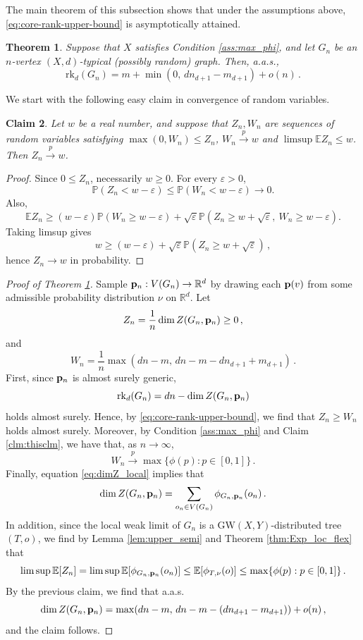 \documentclass[reqno,english]{amsart}
\numberwithin{equation}{section}
\newtheorem{theorem}{Theorem}[section]
\newtheorem{claim}[theorem]{Claim}
\theoremstyle{definition}{
\newtheorem{example}[theorem]{Example}
\newtheorem{definition}[theorem]{Definition}
\newtheorem*{definition*}{Definition}
\newtheorem{problem}[theorem]{Problem}
\newtheorem{question}[theorem]{Question}
}
\newcommand{\E}{\mathbb E}
\renewcommand{\P}{\mathbb P}
\newcommand{\R}{\mathbb R}
\newcommand{\p}{{\bf p}}
\begin{document}
The main theorem of this subsection shows that under the assumptions above, \eqref{eq:core-rank-upper-bound} is asymptotically attained.
\begin{theorem}\label{thm:rd_degreeX}
Suppose that $X$ satisfies Condition \ref{ass:max_phi}, and 
let $G_n$ be an $n$-vertex $(X,d)$-typical (possibly random) graph. Then, a.a.s.,
\[ 
\mathrm{rk}_d(G_n)=
    m+\min\left(0,\,dn_{d+1}-m_{d+1}\right) + o(n)\,.
\]
\end{theorem}
We start with the following easy claim in convergence of random variables.
\begin{claim}
    Let $w$ be a real number, and suppose that $Z_n,W_n$ are sequences of random variables satisfying $\max(0,W_n)\le Z_n$, $W_n\xrightarrow{p}w$ and $\limsup\E Z_n\le w$. Then $Z_n \xrightarrow{p}w$.
\end{claim}
\begin{proof}
    Since \(0\le Z_n\), necessarily \(w\ge 0\). For every \(\varepsilon>0\),
    \[
        \P(Z_n<w-\varepsilon)\le \P(W_n<w-\varepsilon)\to 0 .
    \]
    Also,
    \[
        \E Z_n\ge (w-\varepsilon)\P(W_n\ge w-\varepsilon)
        +\sqrt\varepsilon \P(Z_n\ge w+\sqrt\varepsilon,\ W_n\ge w-\varepsilon).
    \]
    Taking limsup gives
    \[
        w\ge (w-\varepsilon)+\sqrt\varepsilon\P(Z_n\ge w+\sqrt\varepsilon)\,,
    \]
    hence \(Z_n\to w\) in probability.
\end{proof}
\begin{proof}[Proof of Theorem \ref{thm:rd_degreeX}]
Sample $\p_n:V(G_n)\to\R^d$ by drawing each $\p(v)$ from some admissible probability distribution $\nu$ on $\R^d$.
Let $$Z_n= \frac{1}n\dim Z(G_n,\p_n)\ge 0\,,$$ and $$W_n = \frac{1}n\max(dn-m,\,dn-m - dn_{d+1}+m_{d+1})\,.$$
First, since \(\p_n\) is almost surely generic,
\[
\mathrm{rk}_d(G_n)=dn-\dim Z(G_n,\p_n)
\]
holds almost surely. Hence, by
\eqref{eq:core-rank-upper-bound}, we find that $Z_n\ge W_n$ holds almost surely.
Moreover, by Condition \ref{ass:max_phi} and Claim \ref{clm:thisclm}, we have that, as $n\to\infty$,
\begin{equation}\label{eq:W}
W_n\xrightarrow{p} \max\{\phi(p):p\in[0,1]\}\,.  
\end{equation}
Finally, equation \eqref{eq:dimZ_local} implies that
\[
\dim Z(G_n,\p_n) = \sum_{o_n\in V(G_n)}\phi_{G_n,\p_n}(o_n)\,.
\]
In addition, since the local weak limit of $G_n$ is a $\mathrm{GW}(X,Y)$-distributed tree $(T,o)$, we find by Lemma \ref{lem:upper_semi} and Theorem \ref{thm:Exp_loc_flex} that
\[
\limsup \E[Z_n] = \limsup \E[\phi_{G_n,\p_n}(o_n)] \le \E[\phi_{T,\nu}(o)]\le \max\{\phi(p):p\in[0,1]\}\,.
\]
By the previous claim, we find that a.a.s.
\[
\dim Z(G_n,\p_n)
=
\max(dn-m,\,dn-m-(dn_{d+1}-m_{d+1}))+o(n)\,,
\]
and the claim follows.
\end{proof}
\end{document}
